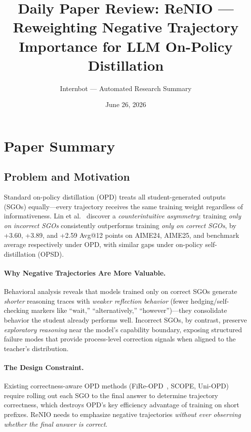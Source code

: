 \documentclass[11pt,a4paper]{article}
\title{Daily Paper Review: ReNIO --- Reweighting Negative Trajectory\\Importance for LLM On-Policy Distillation}
\author{Internbot --- Automated Research Summary}
\date{June 26, 2026}
\begin{document}
\maketitle

\section{Paper Summary}

\subsection{Problem and Motivation}

Standard on-policy distillation (OPD) treats all student-generated outputs (SGOs) equally---every trajectory receives the same training weight regardless of informativeness. Lin et al.~\cite{lin2026renio} discover a \emph{counterintuitive asymmetry}: training \emph{only on incorrect SGOs} consistently outperforms training \emph{only on correct SGOs}, by +3.60, +3.89, and +2.59 Avg@12 points on AIME24, AIME25, and benchmark average respectively under OPD, with similar gaps under on-policy self-distillation (OPSD).

\paragraph{Why Negative Trajectories Are More Valuable.} Behavioral analysis reveals that models trained only on correct SGOs generate \emph{shorter} reasoning traces with \emph{weaker reflection behavior} (fewer hedging/self-checking markers like ``wait,'' ``alternatively,'' ``however'')---they consolidate behavior the student already performs well. Incorrect SGOs, by contrast, preserve \emph{exploratory reasoning} near the model's capability boundary, exposing structured failure modes that provide process-level correction signals when aligned to the teacher's distribution.

\paragraph{The Design Constraint.} Existing correctness-aware OPD methods (FiRe-OPD~\cite{li2026fireopd}, SCOPE, Uni-OPD) require rolling out each SGO to the final answer to determine trajectory correctness, which destroys OPD's key efficiency advantage of training on short prefixes. ReNIO needs to emphasize negative trajectories \emph{without ever observing whether the final answer is correct}.
\end{document}
